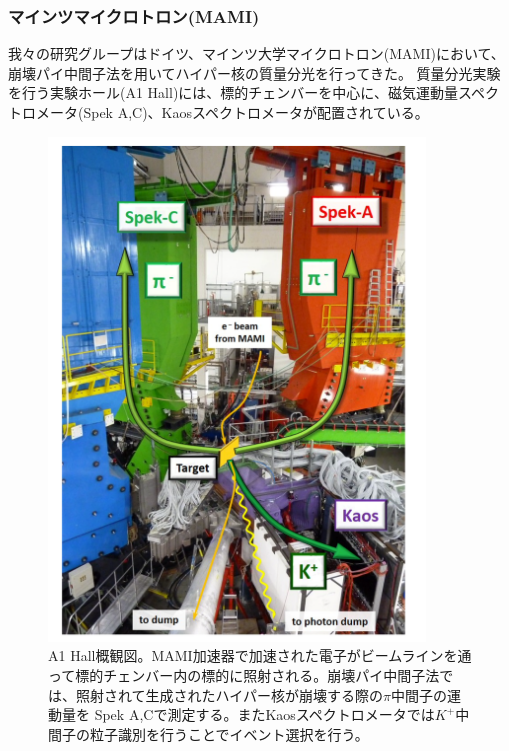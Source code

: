 \documentclass[a4paper,11pt,uplatex]{jsbook}
\begin{document}
\subsubsection{マインツマイクロトロン(MAMI)}
我々の研究グループはドイツ、マインツ大学マイクロトロン(MAMI)において、崩壊パイ中間子法を用いてハイパー核の質量分光を行ってきた。
質量分光実験を行う実験ホール(A1 Hall)には、標的チェンバーを中心に、磁気運動量スペクトロメータ(Spek A,C)、Kaosスペクトロメータが配置されている。
\begin{figure}[tb]
  \centering
  \includegraphics[width=10cm]{image/1-HallA.png}
  \caption[MAMI実験ホール]{A1 Hall概観図。MAMI加速器で加速された電子がビームラインを通って標的チェンバー内の標的に照射される。崩壊パイ中間子法では、照射されて生成されたハイパー核が崩壊する際の$\pi$中間子の運動量を
  Spek A,Cで測定する。またKaosスペクトロメータでは$K^+$中間子の粒子識別を行うことでイベント選択を行う。\cite{esserObservation4Hyperhydrogen2015}}
\end{figure}
\end{document}

